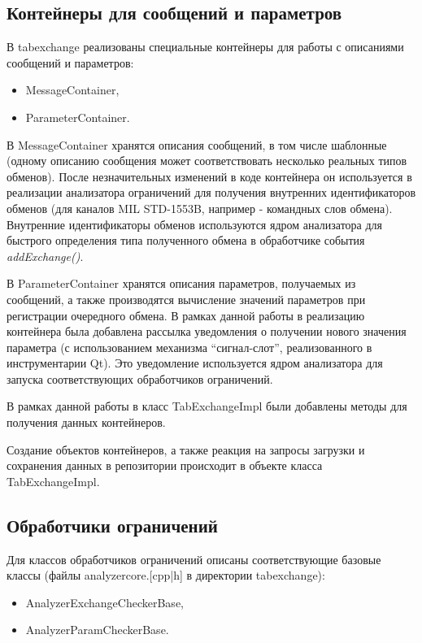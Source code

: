\subsection{Контейнеры для сообщений и параметров}

В tabexchange реализованы специальные контейнеры для работы с описаниями 
сообщений и параметров:

\begin{itemize}
 \item MessageContainer,
 \item ParameterContainer.
\end{itemize}

В MessageContainer хранятся описания сообщений, в том числе шаблонные (одному 
описанию сообщения может соответствовать несколько реальных типов обменов). 
После незначительных изменений в коде контейнера он используется в реализации 
анализатора ограничений для получения внутренних идентификаторов обменов (для 
каналов MIL STD-1553B, например - командных слов обмена). Внутренние 
идентификаторы обменов используются ядром анализатора для быстрого определения 
типа полученного обмена в обработчике события \textit{addExchange()}.

В ParameterContainer хранятся описания параметров, получаемых из сообщений, а 
также производятся вычисление значений параметров при регистрации очередного 
обмена. В рамках данной работы в реализацию контейнера была добавлена рассылка 
уведомления о получении нового значения параметра (с использованием механизма 
``сигнал-слот'', реализованного в инструментарии Qt). Это уведомление 
используется ядром анализатора для запуска соответствующих обработчиков 
ограничений.

В рамках данной работы в класс TabExchangeImpl были добавлены методы для 
получения данных контейнеров.

Создание объектов контейнеров, а также реакция на запросы загрузки и сохранения 
данных в репозитории происходит в объекте класса TabExchangeImpl.

\subsection{Обработчики ограничений}

Для классов обработчиков ограничений описаны соответствующие базовые классы 
(файлы analyzercore.[cpp|h] в директории tabexchange):

\begin{itemize}
 \item AnalyzerExchangeCheckerBase,
 \item AnalyzerParamCheckerBase.
\end{itemize}

